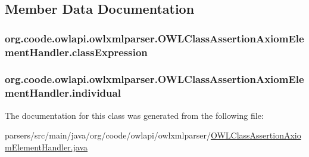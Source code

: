 \subsection{Member Data Documentation}
\hypertarget{classorg_1_1coode_1_1owlapi_1_1owlxmlparser_1_1_o_w_l_class_assertion_axiom_element_handler_ae231e6104b9cd2ad95ae27d11b48ff99}{
\subsubsection[{class\-Expression}]{ org.\-coode.\-owlapi.\-owlxmlparser.\-O\-W\-L\-Class\-Assertion\-Axiom\-Element\-Handler.\-class\-Expression\hspace{0.3cm}{\ttfamily [private]}}}\label{classorg_1_1coode_1_1owlapi_1_1owlxmlparser_1_1_o_w_l_class_assertion_axiom_element_handler_ae231e6104b9cd2ad95ae27d11b48ff99}
\hypertarget{classorg_1_1coode_1_1owlapi_1_1owlxmlparser_1_1_o_w_l_class_assertion_axiom_element_handler_a0a84457512b396d8c0ed8e227c5d93f1}{
\subsubsection[{individual}]{ org.\-coode.\-owlapi.\-owlxmlparser.\-O\-W\-L\-Class\-Assertion\-Axiom\-Element\-Handler.\-individual\hspace{0.3cm}{\ttfamily [private]}}}\label{classorg_1_1coode_1_1owlapi_1_1owlxmlparser_1_1_o_w_l_class_assertion_axiom_element_handler_a0a84457512b396d8c0ed8e227c5d93f1}


The documentation for this class was generated from the following file\-:\begin{DoxyCompactItemize}
\item 
parsers/src/main/java/org/coode/owlapi/owlxmlparser/\hyperlink{_o_w_l_class_assertion_axiom_element_handler_8java}{O\-W\-L\-Class\-Assertion\-Axiom\-Element\-Handler.\-java}\end{DoxyCompactItemize}
